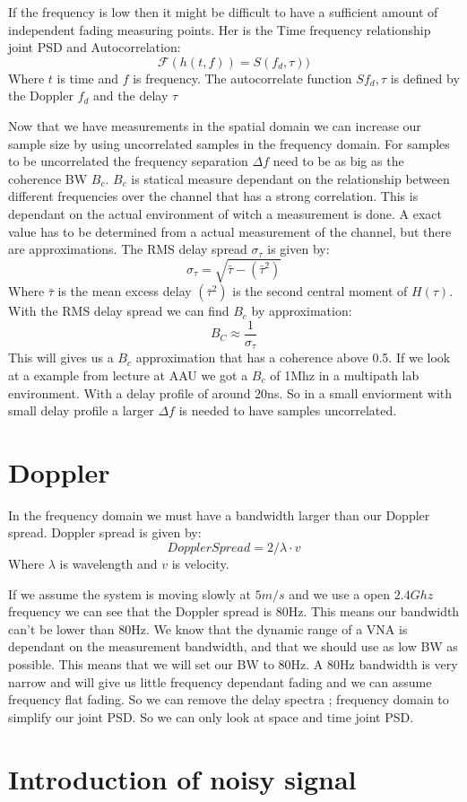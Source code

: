 If the frequency is low then it might be difficult to have a sufficient amount of independent fading measuring points. \citep[p.11]{UWMeasurement}
Her is the Time frequency relationship joint PSD and Autocorrelation:
\begin{equation}
\mathcal{F} ( h(t,f) ) =
 S(f_d,\tau) )
\end{equation}
Where $t$ is time and $f$ is frequency. The autocorrelate function $S{f_d,\tau}$ is defined by the Doppler $f_d$ and the delay $\tau$

Now that we have measurements in the spatial domain we can increase our sample size by using uncorrelated samples in the frequency domain. For samples to be uncorrelated the frequency separation $\Delta f$ need to be as big as the coherence BW $B_{c}$. $B_{c}$ is statical measure dependant on the relationship between different frequencies over the channel that has a strong correlation. This is dependant on the actual environment of witch a measurement is done. A exact value has to be determined from  a actual measurement of the channel, but there are approximations. The RMS delay spread $\sigma_{\tau}$ is given by:
\begin{equation}
\sigma_{\tau} = \sqrt{\bar{\tau} - {(\bar{\tau}^{2})}}
\end{equation}
Where $\bar{\tau}$ is the mean excess delay $(\bar{\tau}^{2})$ is 
the second central moment of $H(\tau)$. With the RMS delay spread we can find $B_c$ by approximation:
\begin{equation}
B_C \approx \frac{1}{\sigma_{\tau}}
\end{equation}
This will gives us a $B_c$ approximation that has a coherence above 0.5. 
\citep{RayFadeHandbook}
If we look at a example from lecture at AAU we got a $B_c$ of 1Mhz in a multipath lab environment. With a delay profile of around 20ns. So in a small enviorment with small delay profile a larger $\Delta f$ is needed to have samples uncorrelated.
\citep[Chapter 18.5]{ComHandbook}

\section{Doppler}
In the frequency domain we must have a bandwidth larger than our Doppler spread. Doppler spread is given by:
\begin{equation}
Doppler Spread = 2/\lambda \cdot v
\end{equation}
Where $\lambda$ is wavelength and $v$ is velocity.

If we assume the system is moving slowly at $5m/s$ and we use a open $2.4Ghz$ frequency we can see that the Doppler spread is 80Hz. This means our bandwidth can't be lower than 80Hz. We know that the dynamic range of a VNA is dependant on the measurement bandwidth, and that we should use as low BW as possible. This means that we will set our BW to 80Hz. A 80Hz bandwidth is very narrow and will give us little frequency dependant fading and we can assume frequency flat fading. So we can remove the delay spectra ; frequency domain to simplify our joint PSD. So we can only look at space and time joint PSD.

\section{Introduction of noisy signal}